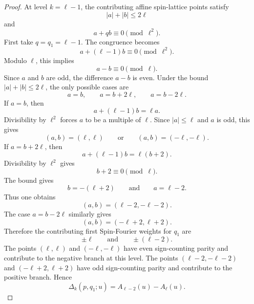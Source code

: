 \documentclass{article}
\theoremstyle{definition}
\numberwithin{equation}{section}
\begin{document}
\begin{proof}
At level $k=\ell-1$, the contributing affine spin-lattice points satisfy
\begin{equation}
|a|+|b|\leq 2\ell
\end{equation}
and
\begin{equation}
a+qb\equiv0\pmod{\ell^2}.
\end{equation}
First take $q=q_1=\ell-1$.  The congruence becomes
\begin{equation}
a+(\ell-1)b\equiv0\pmod{\ell^2}.
\end{equation}
Modulo $\ell$, this implies
\begin{equation}
a-b\equiv0\pmod{\ell}.
\end{equation}
Since $a$ and $b$ are odd, the difference $a-b$ is even.  Under the bound $|a|+|b|\leq2\ell$, the only possible cases are
\begin{equation}
a=b,
\qquad
a=b+2\ell,
\qquad
a=b-2\ell.
\end{equation}
If $a=b$, then
\begin{equation}
a+(\ell-1)b=\ell a.
\end{equation}
Divisibility by $\ell^2$ forces $a$ to be a multiple of $\ell$.  Since $|a|\leq\ell$ and $a$ is odd, this gives
\begin{equation}
(a,b)=(\ell,\ell)
\qquad\text{or}\qquad
(a,b)=(-\ell,-\ell).
\end{equation}
If $a=b+2\ell$, then
\begin{equation}
a+(\ell-1)b=\ell(b+2).
\end{equation}
Divisibility by $\ell^2$ gives
\begin{equation}
b+2\equiv0\pmod{\ell}.
\end{equation}
The bound gives
\begin{equation}
b=-(\ell+2)
\qquad\text{and}\qquad
a=\ell-2.
\end{equation}
Thus one obtains
\begin{equation}
(a,b)=(\ell-2,-\ell-2).
\end{equation}
The case $a=b-2\ell$ similarly gives
\begin{equation}
(a,b)=(-\ell+2,\ell+2).
\end{equation}
Therefore the contributing first Spin-Fourier weights for $q_1$ are
\begin{equation}
\pm\ell
\qquad\text{and}\qquad
\pm(\ell-2).
\end{equation}
The points $(\ell,\ell)$ and $(-\ell,-\ell)$ have even sign-counting parity and contribute to the negative branch at this level.  The points $(\ell-2,-\ell-2)$ and $(-\ell+2,\ell+2)$ have odd sign-counting parity and contribute to the positive branch.  Hence
\begin{equation}
\Delta_k(p,q_1;u)=A_{\ell-2}(u)-A_{\ell}(u).
\end{equation}


\end{proof}
\end{document}
